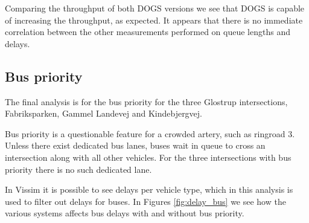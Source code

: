 Comparing the throughput of both DOGS versions we see that DOGS is capable of increasing the throughput, as expected. It appears that there is no immediate correlation between the other measurements performed on queue lengths and delays.

\subsection{Bus priority}
The final analysis is for the bus priority for the three Glostrup intersections, Fabriksparken, Gammel Landevej and Kindebjergvej.

Bus priority is a questionable feature for a crowded artery, such as ringroad 3. Unless there exist dedicated bus lanes, buses wait in queue to cross an intersection along with all other vehicles. For the three intersections with bus priority there is no such dedicated lane.

In Vissim it is possible to see delays per vehicle type, which in this analysis is used to filter out delays for buses.
In Figures \ref{fig:delay_bus} we see how the various systems affects bus delays with and without bus priority.

